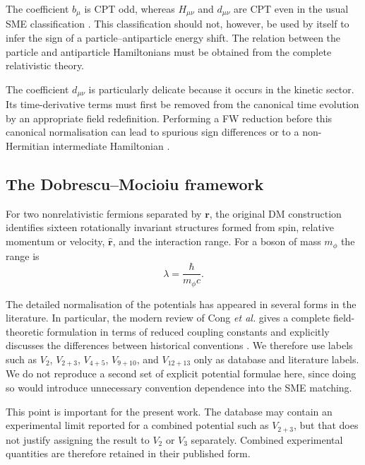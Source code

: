 \documentclass[aps,prd,reprint,superscriptaddress,nofootinbib]{revtex4-2}
\begin{document}
	The coefficient $b_\mu$ is CPT odd, whereas $H_{\mu\nu}$ and
	$d_{\mu\nu}$ are CPT even in the usual SME classification
	\cite{ColladayKostelecky1997,ColladayKostelecky1998,
		KosteleckyRussell2026}. This classification should not, however, be
	used by itself to infer the sign of a particle--antiparticle energy
	shift. The relation between the particle and antiparticle Hamiltonians
	must be obtained from the complete relativistic theory.
	
	The coefficient $d_{\mu\nu}$ is particularly delicate because it occurs
	in the kinetic sector. Its time-derivative terms must first be removed
	from the canonical time evolution by an appropriate field
	redefinition. Performing a FW reduction before this canonical
	normalisation can lead to spurious sign differences or to a
	non-Hermitian intermediate Hamiltonian \cite{KosteleckyLane1999}.
	
	\subsection{The Dobrescu--Mocioiu framework}
	
	For two nonrelativistic fermions separated by $\mathbf r$, the original
	DM construction identifies sixteen rotationally invariant structures
	formed from spin, relative momentum or velocity, $\hat{\mathbf r}$,
	and the interaction range. For a boson of mass $m_\phi$ the range is
	\begin{equation}
		\lambda=\frac{\hbar}{m_\phi c}.
		\label{eq:lambda}
	\end{equation}
	
	The detailed normalisation of the potentials has appeared in several
	forms in the literature. In particular, the modern review of
	Cong \textit{et al.} gives a complete field-theoretic formulation in
	terms of reduced coupling constants and explicitly discusses the
	differences between historical conventions
	\cite{Cong2025}. We therefore use labels such as $V_2$, $V_{2+3}$,
	$V_{4+5}$, $V_{9+10}$, and $V_{12+13}$ only as database and literature
	labels. We do not reproduce a second set of explicit potential
	formulae here, since doing so would introduce unnecessary convention
	dependence into the SME matching.
	
	This point is important for the present work. The database may contain
	an experimental limit reported for a combined potential such as
	$V_{2+3}$, but that does not justify assigning the result to $V_2$ or
	$V_3$ separately. Combined experimental quantities are therefore
	retained in their published form.
	
\end{document}

